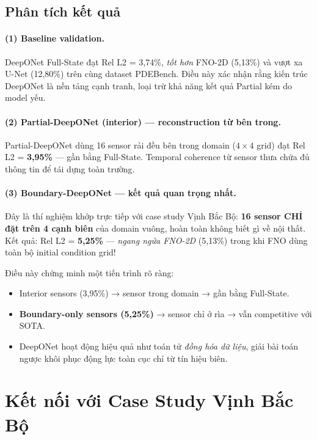\documentclass[12pt,a4paper]{article}
\begin{document}
\subsection{Phân tích kết quả}

\paragraph{(1) Baseline validation.}
DeepONet Full-State đạt Rel L2 = 3,74\%, \emph{tốt hơn} FNO-2D (5,13\%) và vượt xa U-Net (12,80\%) trên cùng dataset PDEBench. Điều này xác nhận rằng kiến trúc DeepONet là nền tảng cạnh tranh, loại trừ khả năng kết quả Partial kém do model yếu.

\paragraph{(2) Partial-DeepONet (interior) --- reconstruction từ bên trong.}
Partial-DeepONet dùng 16 sensor rải đều bên trong domain ($4 \times 4$ grid) đạt Rel L2 = \textbf{3,95\%} --- gần bằng Full-State. Temporal coherence từ sensor thưa chứa đủ thông tin để tái dựng toàn trường.

\paragraph{(3) Boundary-DeepONet --- kết quả quan trọng nhất.}
Đây là thí nghiệm khớp trực tiếp với case study Vịnh Bắc Bộ: \textbf{16 sensor CHỈ đặt trên 4 cạnh biên} của domain vuông, hoàn toàn không biết gì về nội thất. Kết quả: Rel L2 = \textbf{5,25\%} --- \emph{ngang ngửa FNO-2D} (5,13\%) trong khi FNO dùng toàn bộ initial condition grid!

Điều này chứng minh một tiến trình rõ ràng:
\begin{itemize}[nosep]
  \item Interior sensors (3,95\%) → sensor trong domain → gần bằng Full-State.
  \item \textbf{Boundary-only sensors (5,25\%)} → sensor chỉ ở rìa → vẫn competitive với SOTA.
  \item DeepONet hoạt động hiệu quả như toán tử \emph{đồng hóa dữ liệu}, giải bài toán ngược khôi phục động lực toàn cục chỉ từ tín hiệu biên.
\end{itemize}

\section{Kết nối với Case Study Vịnh Bắc Bộ}
\end{document}
